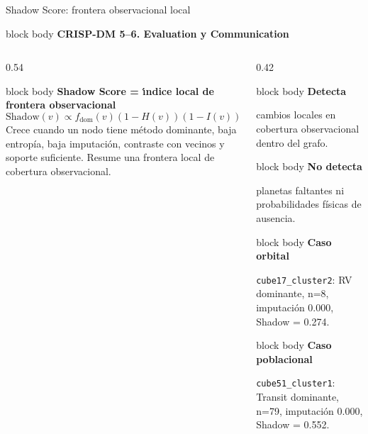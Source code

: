 \documentclass[aspectratio=169,9pt]{beamer}
\newcommand{\phasebar}[1]{
  \begin{beamercolorbox}[wd=\linewidth,sep=0.22em,rounded=true]{block body}
    {\scriptsize\color{accent}\bfseries CRISP-DM \hspace{0.6em}\color{textmuted}#1}
  \end{beamercolorbox}
}
\newcommand{\infocard}[2]{
  \begin{beamercolorbox}[wd=\linewidth,sep=0.34em,rounded=true]{block body}
    {\small\bfseries #1}\par
    \vspace{0.05em}
    {\scriptsize #2}
  \end{beamercolorbox}
}
\begin{document}
\begin{frame}[t]{Shadow Score: frontera observacional local}
  \phasebar{5--6. Evaluation y Communication}
  \vspace{0.08cm}
  \begin{columns}[T,onlytextwidth]
    \begin{column}{0.54\textwidth}
      \begin{beamercolorbox}[wd=\linewidth,sep=0.62em,rounded=true]{block body}
        {\small\bfseries Shadow Score = \'{\i}ndice local de frontera observacional}
        \[
        \mathrm{Shadow}(v)\propto f_{\mathrm{dom}}(v)(1-H(v))(1-I(v))B(v)S(v)
        \]
        {\scriptsize Crece cuando un nodo tiene m\'etodo dominante, baja entrop\'ia, baja imputaci\'on, contraste con vecinos y soporte suficiente. Resume una frontera local de cobertura observacional.}
      \end{beamercolorbox}
    \end{column}
    \begin{column}{0.42\textwidth}
      \infocard{Detecta}{cambios locales en cobertura observacional dentro del grafo.}
      \vspace{0.08cm}
      \infocard{No detecta}{planetas faltantes ni probabilidades f\'isicas de ausencia.}
      \vspace{0.08cm}
      \infocard{Caso orbital}{\texttt{cube17\_cluster2}: RV dominante, n=8, imputaci\'on 0.000, Shadow = 0.274.}
      \vspace{0.08cm}
      \infocard{Caso poblacional}{\texttt{cube51\_cluster1}: Transit dominante, n=79, imputaci\'on 0.000, Shadow = 0.552.}
    \end{column}
  \end{columns}
\end{frame}
\end{document}
